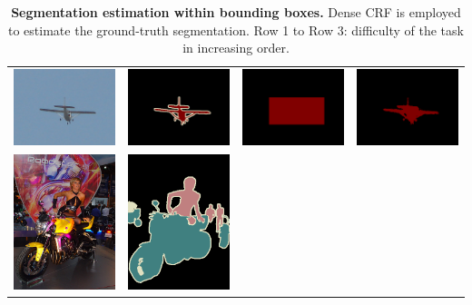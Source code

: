 \begin{table}
  \centering
  \caption{{\bf Segmentation estimation within bounding boxes.} Dense CRF is employed to estimate the ground-truth segmentation. Row 1 to Row 3: difficulty of the task in increasing order.} 
  \begin{tabular}{c c c c}
    \includegraphics[width=0.21\linewidth]{fig/erode_bbox/img/2010_004063.jpg} & 
    \includegraphics[width=0.21\linewidth]{fig/erode_bbox/gt/2010_004063.png} & 
    \includegraphics[width=0.21\linewidth]{fig/erode_bbox/bbox/2010_004063.png} & 
    \includegraphics[width=0.21\linewidth]{fig/erode_bbox/crf/2010_004063.png} \\    
    \includegraphics[width=0.21\linewidth]{fig/erode_bbox/img/2009_002382.jpg} & 
    \includegraphics[width=0.21\linewidth]{fig/erode_bbox/gt/2009_002382.png} & 

\end{tabular}
\end{table}
